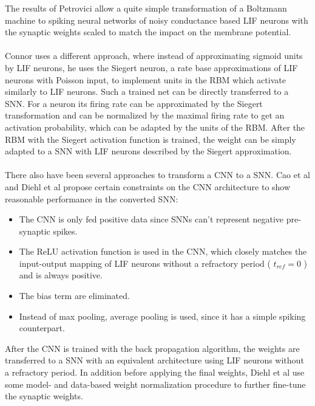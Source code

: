 The results of Petrovici allow a quite simple transformation of a Boltzmann machine to spiking neural networks of noisy conductance based LIF neurons with the synaptic weights scaled to match the impact on the membrane potential.
\\
\\
Connor uses a different approach, where instead of approximating sigmoid units by LIF neurons, he uses the Siegert neuron, a rate base approximations of LIF neurons with Poisson input, to implement units in the RBM which activate similarly to LIF neurons. 
Such a trained net can be directly transferred to a SNN.
For a neuron its firing rate can be approximated by the Siegert transformation and can be normalized by the maximal firing rate to get an activation probability, which can be adapted by the units of the RBM. 
After the RBM with the Siegert activation function is trained, the weight can be simply adapted to a SNN with LIF neurons described by the Siegert approximation.
\\
\\
There also have been several approaches to transform a CNN to a SNN.  
Cao et al and Diehl et al propose certain constraints on the CNN architecture to show reasonable performance in the converted SNN:
\begin{itemize}
\item The CNN is only fed positive data since SNNs can't represent negative pre-synaptic spikes. 
\item The ReLU activation function is used in the CNN, which closely matches the input-output mapping of LIF neurons without a refractory period ( $t_{ref}=0$ ) and is always positive.
\item The bias term are eliminated.
\item Instead of max pooling, average pooling is used, since it has a simple spiking counterpart.
\end{itemize}
After the CNN is trained with the back propagation algorithm, the weights are transferred to a SNN with an equivalent architecture using LIF neurons without a refractory period. 
In addition before applying the final weights, Diehl et al use some model- and data-based weight normalization procedure to further fine-tune the synaptic weights. 

